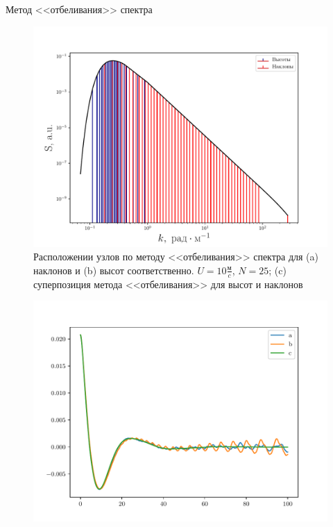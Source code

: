 \begin{frame}[t]{}
\begin{columns}[t]
\begin{column}{.48\linewidth}
\begin{block}{Метод <<отбеливания>> спектра}
\begin{figure}[H]
\begin{minipage}{0.32\linewidth}
                            \includegraphics[width=\linewidth]{nodes}
                    \end{minipage}

                    \caption{Расположении узлов по методу <<отбеливания>> спектра  для (a) наклонов и (b) высот соответственно. $U=10 \frac{\text{м}}{c}$, $N=25$; (c) суперпозиция 
                    метода <<отбеливания>> для высот и наклонов}
                    \label{fig:splits}		
                \end{figure}

                \begin{figure}[h]
                    \centering
                    \begin{minipage}{0.49\linewidth}
                            \centering
                            \includegraphics[width=\linewidth]{fig/corr1}


\end{minipage}
\end{figure}
\end{block}
\end{column}
\end{columns}
\end{frame}
